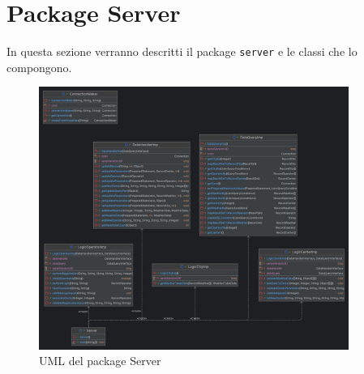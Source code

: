 \section{Package Server}
In questa sezione verranno descritti il package \texttt{server} e le classi che lo compongono.\\

\begin{figure}[H]
    \centering
    \includegraphics[width=0.9\textwidth]{img/serverClassDiagram.jpg}
    \caption{UML del package Server}
    \label{fig:Server}
\end{figure}

